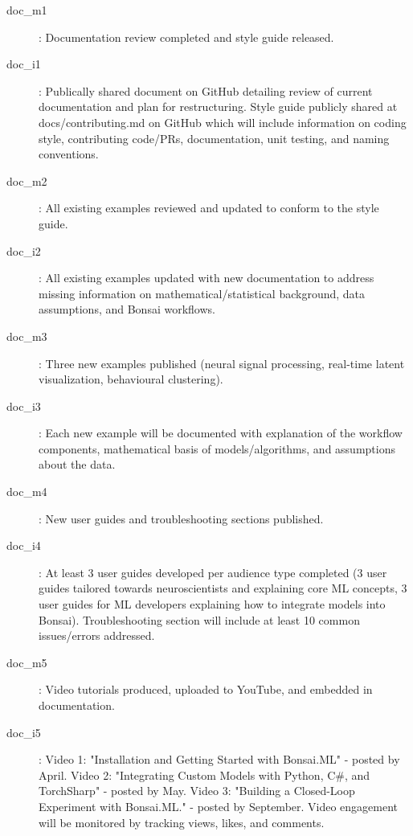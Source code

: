 \begin{description}

    \item[doc\_m1]: Documentation review completed and style guide released.
    \item[doc\_i1]: Publically shared document on GitHub detailing review of current documentation and plan for restructuring. Style guide publicly shared at docs/contributing.md on GitHub which will include information on coding style, contributing code/PRs, documentation, unit testing, and naming conventions.
    
    \item[doc\_m2]: All existing examples reviewed and updated to conform to the style guide.
    \item[doc\_i2]: All existing examples updated with new documentation to address missing information on mathematical/statistical background, data assumptions, and Bonsai workflows.
    
    \item[doc\_m3]: Three new examples published (neural signal processing, real-time latent visualization, behavioural clustering).
    \item[doc\_i3]: Each new example will be documented with explanation of the workflow components, mathematical basis of models/algorithms, and assumptions about the data.
    
    \item[doc\_m4]: New user guides and troubleshooting sections published.
    \item[doc\_i4]: At least 3 user guides developed per audience type completed (3 user guides tailored towards neuroscientists and explaining core ML concepts, 3 user guides for ML developers explaining how to integrate models into Bonsai). Troubleshooting section will include at least 10 common issues/errors addressed.
    
    \item[doc\_m5]: Video tutorials produced, uploaded to YouTube, and embedded in documentation.
    \item[doc\_i5]: Video 1: "Installation and Getting Started with Bonsai.ML" - posted by April. Video 2: "Integrating Custom Models with Python, C\#, and TorchSharp" - posted by May. Video 3: "Building a Closed-Loop Experiment with Bonsai.ML." - posted by September. Video engagement will be monitored by tracking views, likes, and comments.

\end{description}

